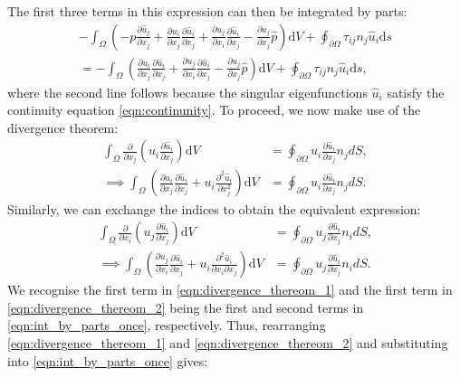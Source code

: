 \documentclass[12pt,a4paper]{article}
\numberwithin{equation}{section}
\newcommand{\D}{\mathrm{d}}
\begin{document}
The first three terms in this expression can then be integrated by parts:
\begin{align}
  -\int_{\Omega} \left( -p\frac{\partial \hat u_j}{\partial x_j} + \frac{\partial u_i}{\partial x_j} \frac{\partial\hat u_i}{\partial x_j}  + \frac{\partial u_j}{\partial x_i} \frac{\partial\hat u_i}{\partial x_j} - \frac{\partial u_j}{\partial x_j}\hat p \right) \D V + \oint_{\partial\Omega}\tau_{ij}n_j\hat u_i\D s \\
  = -\int_{\Omega} \left( \frac{\partial u_i}{\partial x_j} \frac{\partial\hat u_i}{\partial x_j}  + \frac{\partial u_j}{\partial x_i} \frac{\partial\hat u_i}{\partial x_j} - \frac{\partial u_j}{\partial x_j}\hat p \right) \D V + \oint_{\partial\Omega}\tau_{ij}n_j\hat u_i\D s,
  \label{eqn:int_by_parts_once}
\end{align}
where the second line follows because the singular eigenfunctions $\hat u_i$ satisfy the continuity equation \eqref{eqn:continunity}.
To proceed, we now make use of the divergence theorem:
\begin{align}
  \int_{\Omega} \frac{\partial}{\partial x_j}\left(u_i\frac{\partial\hat u_i}{\partial x_j}\right) \D V &=
                                                                                                 \oint_{\partial \Omega} u_i\frac{\partial \hat u_i}{\partial x_j}n_j dS,  \\
\implies \int_{\Omega} \left(\frac{\partial u_i}{\partial x_j} \frac{\partial\hat u_i}{\partial x_j} + u_i\frac{\partial^2 \hat u_i}{\partial x_j^2}\right) \D V &=  \oint_{\partial \Omega} u_i\frac{\partial \hat u_i}{\partial x_j}n_j dS.
  \label{eqn:divergence_thereom_1}
\end{align}
Similarly, we can exchange the indices to obtain the equivalent expression:
\begin{align}
  \int_{\Omega} \frac{\partial}{\partial x_i}\left(u_j\frac{\partial\hat u_i}{\partial x_j}\right) \D V &=
                                                                                                 \oint_{\partial \Omega} u_j\frac{\partial \hat u_i}{\partial x_j}n_i dS,  \\
\implies \int_{\Omega} \left( \frac{\partial u_j}{\partial x_i} \frac{\partial\hat u_i}{\partial x_j} + u_i\frac{\partial^2 \hat u_i}{\partial x_i \partial x_j} \right) \D V &=  \oint_{\partial \Omega} u_j\frac{\partial \hat u_i}{\partial x_j} n_i dS.
  \label{eqn:divergence_thereom_2}
\end{align}
We recognise the first term in \eqref{eqn:divergence_thereom_1} and the first term in \eqref{eqn:divergence_thereom_2} being the first and second terms in \eqref{eqn:int_by_parts_once}, respectively. Thus, rearranging \eqref{eqn:divergence_thereom_1} and \eqref{eqn:divergence_thereom_2} and substituting into \eqref{eqn:int_by_parts_once} gives:
\end{document}
